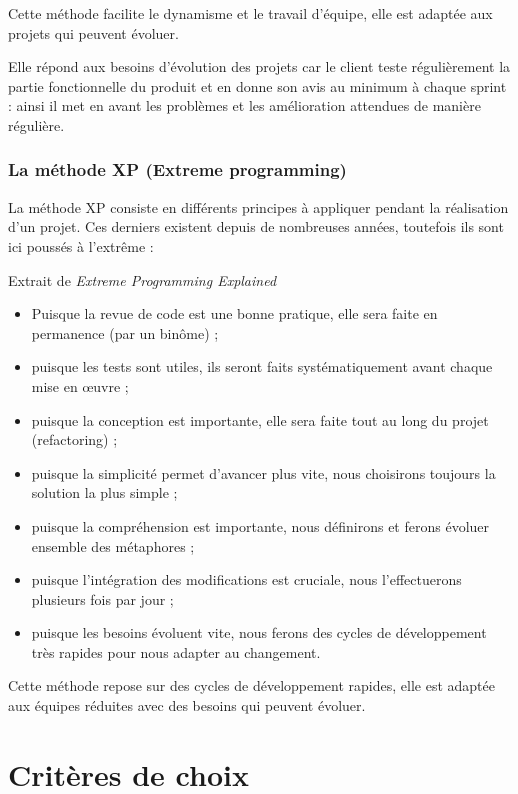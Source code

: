 Cette méthode facilite le dynamisme et le travail d'équipe, elle est adaptée aux projets qui peuvent évoluer.

Elle répond aux besoins d'évolution des projets car le client teste régulièrement la partie fonctionnelle du produit et en donne son avis au minimum à chaque sprint : ainsi il met en avant les problèmes et les amélioration attendues de manière régulière.

\subsubsection{La méthode XP (Extreme programming)}

La méthode XP consiste en différents principes à appliquer pendant la réalisation d'un projet. Ces derniers existent depuis de nombreuses années, toutefois ils sont ici poussés à l'extrême :

Extrait de \textit{Extreme Programming Explained}
\begin{Quote}
\begin{itemize}
\item Puisque la revue de code est une bonne pratique, elle sera faite en permanence (par un binôme) ;
\item puisque les tests sont utiles, ils seront faits systématiquement avant chaque mise en œuvre ;
\item puisque la conception est importante, elle sera faite tout au long du projet (refactoring) ;
\item puisque la simplicité permet d'avancer plus vite, nous choisirons toujours la solution la plus simple ;
\item puisque la compréhension est importante, nous définirons et ferons évoluer ensemble des métaphores ;
\item puisque l'intégration des modifications est cruciale, nous l'effectuerons plusieurs fois par jour ;
\item puisque les besoins évoluent vite, nous ferons des cycles de développement très rapides pour nous adapter au changement.
\end{itemize}
\end{Quote}

Cette méthode repose sur des cycles de développement rapides, elle est adaptée aux équipes réduites avec des besoins qui peuvent évoluer.

\section{Critères de choix}

